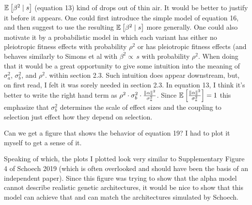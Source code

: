 \begin{point}{} %
$\mathbb{E}_{}\left[\beta^2 \mid s\right]$ (equation 13) kind of drops out of thin air. It would be better to justify it before it
appears. One could first introduce the simple model of equation 16, and then suggest to
use the resulting $\mathbb{E}_{}\left[\beta^2 \mid s\right]$ more generally. One could also motivate it by a probabilistic
model in which each variant has either no pleiotropic fitness effects with probability $\rho^2$ or
has pleiotropic fitness effects (and behaves similarly to Simons et al with $\beta^2 \propto \, s$ with probability $\rho^2$.
When doing that it would be a great opportunity to give some intuition into the meaning
of $\sigma_a^2$, $\sigma_b^2$, and $\rho^2$.
within section 2.3. Such intuition does appear downstream, but, on first
read, I felt it was sorely needed in section 2.3.
In equation 13, I think it’s better to write the right hand term as $\rho^2 \cdot \sigma_b^2 \cdot \frac{\left\| \alpha \right\|^2}{\sigma_a^2}$.
Since $\mathbb{E}_{}\left[\frac{\left\| \alpha \right\|^2}{\sigma_a^2}\right]=1$
this emphasize that $\sigma_b^2$
determines the scale of effect sizes and the coupling
to selection just effect how they depend on selection.
\end{point}


\begin{point}{} %
Can we get a figure that shows the behavior of equation 19? I had to plot it myself to get
a sense of it.
\end{point}


\begin{point}{} %
Speaking of which, the plots I plotted look very similar to Supplementary Figure 4 of
Schoech 2019 (which is often overlooked and should have been the basis of an
independent paper). Since this figure was trying to show that the alpha model cannot
describe realistic genetic architectures, it would be nice to show that this model can
achieve that and can match the architectures simulated by Schoech.
\end{point}

